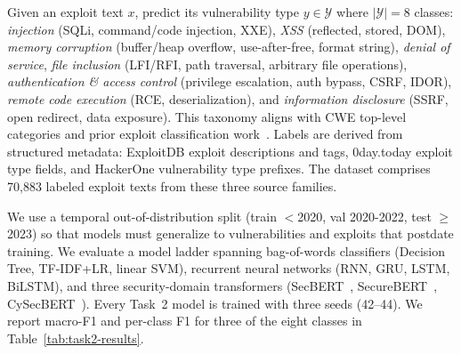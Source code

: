 \documentclass{article}
\begin{document}
Given an exploit text $x$, predict its vulnerability type $y \in \mathcal{Y}$ where $|\mathcal{Y}| = 8$ classes: \emph{injection} (SQLi, command/code injection, XXE), \emph{XSS} (reflected, stored, DOM), \emph{memory corruption} (buffer/heap overflow, use-after-free, format string), \emph{denial of service}, \emph{file inclusion} (LFI/RFI, path traversal, arbitrary file operations), \emph{authentication \& access control} (privilege escalation, auth bypass, CSRF, IDOR), \emph{remote code execution} (RCE, deserialization), and \emph{information disclosure} (SSRF, open redirect, data exposure). This taxonomy aligns with CWE top-level categories and prior exploit classification work~\citep{ampel2020dtl,ampel2024misq}. Labels are derived from structured metadata: ExploitDB exploit descriptions and tags, 0day.today exploit type fields, and HackerOne vulnerability type prefixes. The dataset comprises 70,883 labeled exploit texts from these three source families.

We use a temporal out-of-distribution split (train $<$2020, val 2020-2022, test $\geq$2023) so that models must generalize to vulnerabilities and exploits that postdate training. We evaluate a model ladder spanning bag-of-words classifiers (Decision Tree, TF-IDF+LR, linear SVM), recurrent neural networks (RNN, GRU, LSTM, BiLSTM), and three security-domain transformers (SecBERT~\citep{secbert2022}, SecureBERT~\citep{aghaei2023securebert}, CySecBERT~\citep{bayer2024cysecbert}). Every Task~2 model is trained with three seeds (42--44). We report macro-F1 and per-class F1 for three of the eight classes in Table~\ref{tab:task2-results}.
\end{document}
